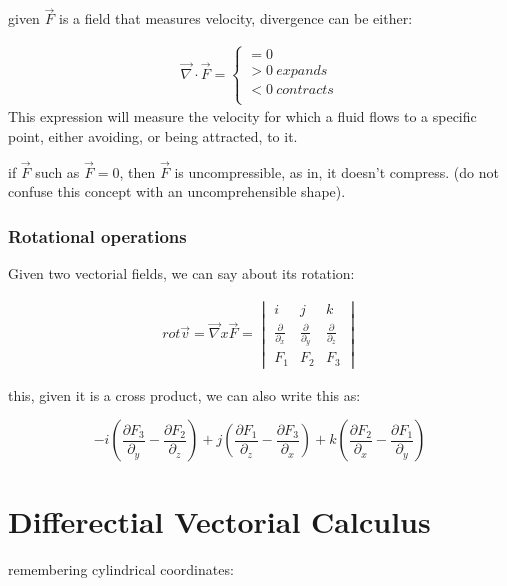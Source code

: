\documentclass[11pt,fleqn]{book} %
\begin{document}
given $\vec{F}$ is a field that measures velocity, divergence can be either:

\begin{gather}
    \vec{\nabla} \cdot \vec{F} = \begin{cases}
        = 0 \\
        > 0 \ expands\\
        < 0 \ contracts \\
    \end{cases}
\end{gather}
This expression will measure the velocity for which a fluid flows to a specific point, either avoiding, or being attracted, to it.

if $\vec{F}$ such as $\vec{F} = 0$, then $\vec{F}$ is uncompressible, as in, it doesn't compress. (do not confuse this concept with an uncomprehensible shape).

\subsubsection{Rotational operations }

Given two vectorial fields, we can say about its rotation:

\begin{gather}
    rot \vec{v} = \vec{\nabla} x \vec{F} = \begin{vmatrix}
        i & j & k \\
        \frac{\partial}{\partial_x} & \frac{\partial}{\partial_y} & \frac{\partial}{\partial_z} \\
        F_1 & F_2 & F_3
    \end{vmatrix}
\end{gather}

this, given it is a cross product, we can also write this as:


\begin{equation}
    -i (\frac{\partial F_3}{\partial_y}-\frac{\partial F_2}{\partial_z}) + j(\frac{\partial F_1}{\partial_z} - \frac{\partial F_3}{\partial_x}) + k (\frac{\partial F_2}{\partial_x} - \frac{\partial F_1}{\partial_y})
\end{equation}

\section{Differectial Vectorial Calculus}

remembering cylindrical coordinates:
\end{document}
